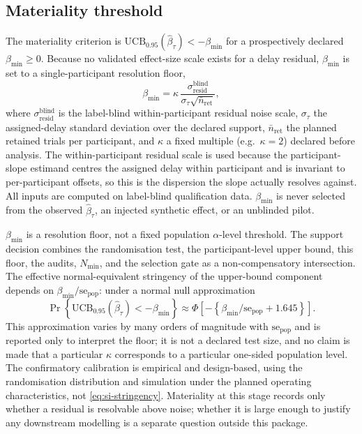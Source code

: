 \documentclass[11pt,a4paper]{article}
\theoremstyle{definition}
\newcommand{\UCB}{\mathrm{UCB}_{0.95}}
\begin{document}
\subsection{Materiality threshold}
\label{sec:si-beta-min}

The materiality criterion is \(\UCB(\widehat{\beta}_\tau)<-\beta_{\min}\) for a
prospectively declared \(\beta_{\min}\ge0\). Because no validated effect-size
scale exists for a delay residual, \(\beta_{\min}\) is set to a single-participant
resolution floor,
\begin{equation}
\label{eq:si-beta-min}
\beta_{\min}
=\kappa\,\frac{\sigma_{\mathrm{resid}}^{\mathrm{blind}}}
              {\sigma_{\tau}\sqrt{\bar n_{\mathrm{ret}}}},
\end{equation}
where \(\sigma_{\mathrm{resid}}^{\mathrm{blind}}\) is the label-blind
within-participant residual noise scale, \(\sigma_\tau\) the assigned-delay
standard deviation over the declared support, \(\bar n_{\mathrm{ret}}\) the planned
retained trials per participant, and \(\kappa\) a fixed multiple (e.g.\
\(\kappa=2\)) declared before analysis. The within-participant residual scale is
used because the participant-slope estimand centres the assigned delay within
participant and is invariant to per-participant offsets, so this is the dispersion
the slope actually resolves against. All inputs are computed on label-blind
qualification data. \(\beta_{\min}\) is never selected from the observed
\(\widehat{\beta}_\tau\), an injected synthetic effect, or an unblinded pilot.

\(\beta_{\min}\) is a resolution floor, not a fixed population
\(\alpha\)-level threshold. The support decision combines the randomisation test,
the participant-level upper bound, this floor, the audits, \(N_{\min}\), and the
selection gate as a non-compensatory intersection. The effective normal-equivalent
stringency of the upper-bound component depends on
\(\beta_{\min}/\mathrm{se}_{\mathrm{pop}}\): under a normal null approximation
\begin{equation}
\label{eq:si-stringency}
\Pr\!\left\{\UCB(\widehat{\beta}_\tau)<-\beta_{\min}\right\}
\approx\Phi\!\left[-\left\{\beta_{\min}/\mathrm{se}_{\mathrm{pop}}+1.645\right\}\right].
\end{equation}
This approximation varies by many orders of magnitude with
\(\mathrm{se}_{\mathrm{pop}}\) and is reported only to interpret the floor; it is
not a declared test size, and no claim is made that a particular \(\kappa\)
corresponds to a particular one-sided population level. The confirmatory
calibration is empirical and design-based, using the randomisation distribution
and simulation under the planned operating characteristics, not
\eqref{eq:si-stringency}. Materiality at this stage records only whether a residual
is resolvable above noise; whether it is large enough to justify any downstream
modelling is a separate question outside this package.
\end{document}
